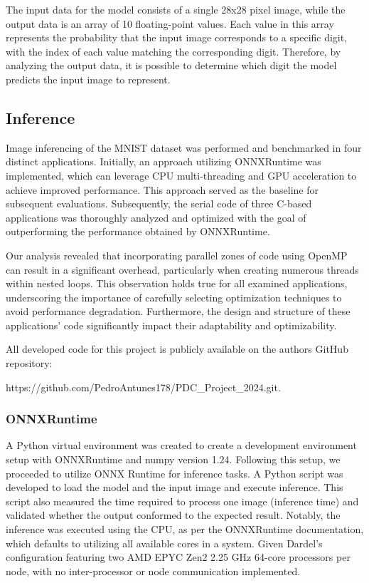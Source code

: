 \documentclass[fleqn,10pt]{olplainarticle}
\begin{document}
The input data for the model consists of a single 28x28 pixel image, while the output data is an array of 10 floating-point values. Each value in this array represents the probability that the input image corresponds to a specific digit, with the index of each value matching the corresponding digit. Therefore, by analyzing the output data, it is possible to determine which digit the model predicts the input image to represent.

\subsection{Inference}
Image inferencing of the MNIST dataset was performed and benchmarked in four distinct applications. Initially, an approach utilizing ONNXRuntime was implemented, which can leverage CPU multi-threading and GPU acceleration to achieve improved performance.  This approach served as the baseline for subsequent evaluations. Subsequently, the serial code of three C-based applications was thoroughly analyzed and optimized with the goal of outperforming the performance obtained by ONNXRuntime.

Our analysis revealed that incorporating parallel zones of code using OpenMP can result in a significant overhead, particularly when creating numerous threads within nested loops. This observation holds true for all examined applications, underscoring the importance of carefully selecting optimization techniques to avoid performance degradation. Furthermore, the design and structure of these applications' code significantly impact their adaptability and optimizability.

All developed code for this project is publicly available on the authors GitHub repository: 

https://github.com/PedroAntunes178/PDC\_Project\_2024.git.

\subsubsection{ONNXRuntime}
A Python virtual environment was created to create a development environment setup with ONNXRuntime and numpy version 1.24. Following this setup, we proceeded to utilize ONNX Runtime for inference tasks. A Python script was developed to load the model and the input image and execute inference. This script also measured the time required to process one image (inference time) and validated whether the output conformed to the expected result. Notably, the inference was executed using the CPU, as per the ONNXRuntime documentation, which defaults to utilizing all available cores in a system. Given Dardel's configuration featuring two AMD EPYC Zen2 2.25 GHz 64-core processors per node, with no inter-processor or node communication implemented.
\end{document}
